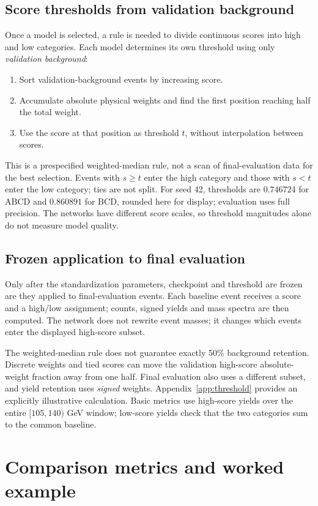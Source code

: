 \documentclass[11pt,a4paper]{article}
\begin{document}
\subsection{Score thresholds from validation background}
Once a model is selected, a rule is needed to divide continuous scores into high and low categories.
Each model determines its own threshold using only \emph{validation background}:
\begin{enumerate}[leftmargin=1.7em,itemsep=2pt,topsep=3pt]
\item Sort validation-background events by increasing score.
\item Accumulate absolute physical weights and find the first position reaching half the total weight.
\item Use the score at that position as threshold $t$, without interpolation between scores.
\end{enumerate}
This is a prespecified weighted-median rule, not a scan of final-evaluation data for the best selection.
Events with $s\geq t$ enter the high category and those with $s<t$ enter the low category; ties are not split.
For seed 42, thresholds are $0.746724$ for ABCD and $0.860891$ for BCD, rounded here for display; evaluation uses full precision.
The networks have different score scales, so threshold magnitudes alone do not measure model quality.

\subsection{Frozen application to final evaluation}
Only after the standardization parameters, checkpoint and threshold are frozen are they applied to final-evaluation events.
Each baseline event receives a score and a high/low assignment; counts, signed yields and mass spectra are then computed.
The network does not rewrite event masses; it changes which events enter the displayed high-score subset.

The weighted-median rule does not guarantee exactly 50\% background retention.
Discrete weights and tied scores can move the validation high-score absolute-weight fraction away from one half.
Final evaluation also uses a different subset, and yield retention uses \emph{signed} weights.
Appendix~\ref{app:threshold} provides an explicitly illustrative calculation.
Basic metrics use high-score yields over the entire $[105,140)$ GeV window; low-score yields check that the two categories sum to the common baseline.

\clearpage
\section{Comparison metrics and worked example}\label{sec:basic}
\end{document}
